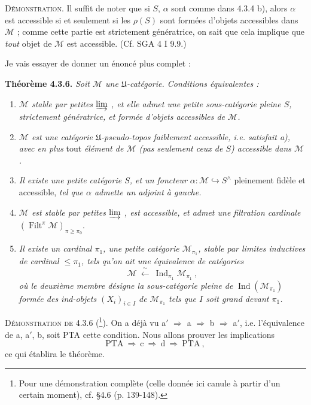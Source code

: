\documentclass[11pt]{article}
\newcommand{\printedpage}[1]{\if\relax\detokenize{#1}\relax\else\marginpar{\footnotesize p.~#1}\fi}
\newcommand{\msp}[1]{\marginpar{\footnotesize [#1]}}
\newcommand{\Filt}{\operatorname{Filt}}
\newcommand{\Ind}{\operatorname{Ind}}
\begin{document}
\noindent\msp{page 70}\textsc{Démonstration}. Il suffit de noter que si $S$, $\alpha$ sont comme dans 4.3.4 b), alors $\alpha$ est accessible si et seulement si les $\rho(S)$ sont formées d'objets accessibles dans $\mathcal M$ ; comme cette partie est strictement génératrice, on sait que cela implique que \textit{tout} objet de $\mathcal M$ est accessible. (Cf. SGA 4 I 9.9.)

\noindent Je vais essayer de donner un énoncé plus complet :

\noindent\textbf{Théorème 4.3.6.} \textit{Soit $\mathcal M$ une $\mathfrak U$-catégorie. Conditions équivalentes :}
\begin{enumerate}[label={}]
\item[\textit{a)}] \textit{$\mathcal M$ stable par petites $\varinjlim$ , et elle admet une petite sous-catégorie pleine $S$, strictement génératrice, et formée d'objets accessibles de $\mathcal M$.}
\item[\textit{a$'$)}] \textit{$\mathcal M$ est une catégorie $\mathfrak U$-pseudo-topos faiblement accessible, i.e. satisfait a), avec en plus} tout \textit{élément de $\mathcal M$ (pas seulement ceux de $S$) accessible dans $\mathcal M$.}
\item[\textit{b)}] \textit{Il existe une petite catégorie $S$, et un foncteur $\alpha:\mathcal M\hookrightarrow S^\wedge$} pleinement fidèle et accessible, \textit{tel que $\alpha$ admette un adjoint à gauche.}
\item[\textit{c)}] \msp{page 71}\textit{$\mathcal M$ est stable par petites $\varinjlim$ , est accessible, et admet une filtration cardinale} $(\Filt^\pi\mathcal M)_{\pi\geqslant\pi_0}$.
\item[\textit{d)}] \textit{Il existe un cardinal $\pi_1$, une petite catégorie $\mathcal M_{\pi_1}$, stable par limites inductives de cardinal $\leqslant\pi_1$, tels qu'on ait une équivalence de catégories}
\[
\mathcal M\ \xleftarrow{\ \sim\ }\ \Ind_{\pi_1}\mathcal M_{\pi_1}\ ,
\tag*{(4.3.6.1)}
\]
\textit{où le deuxième membre désigne la sous-catégorie pleine de} $\Ind(\mathcal M_{\pi_1})$ \textit{formée des ind-objets $(X_i)_{i\in I}$ de $\mathcal M_{\pi_1}$ tels que $I$ soit grand devant $\pi_1$.}
\end{enumerate}

\noindent\textsc{Démonstration de} 4.3.6 (\footnote{Pour une démonstration complète (celle donnée ici canule à partir d'un certain moment), cf. §4.6 (p. 139-148).}). On a déjà vu a$'$ $\Longrightarrow$ a $\Longrightarrow$ b $\Longrightarrow$ a$'$, i.e. l'équivalence de a, a$'$, b, soit PTA cette condition. Nous allons prouver les implications
\[
\mathrm{PTA}\ \Longrightarrow\ \mathrm{c}\ \Longrightarrow\ \mathrm{d}\ \Longrightarrow\ \mathrm{PTA}\ ,
\]
\printedpage{12}%
ce qui établira le théorème.
\end{document}
